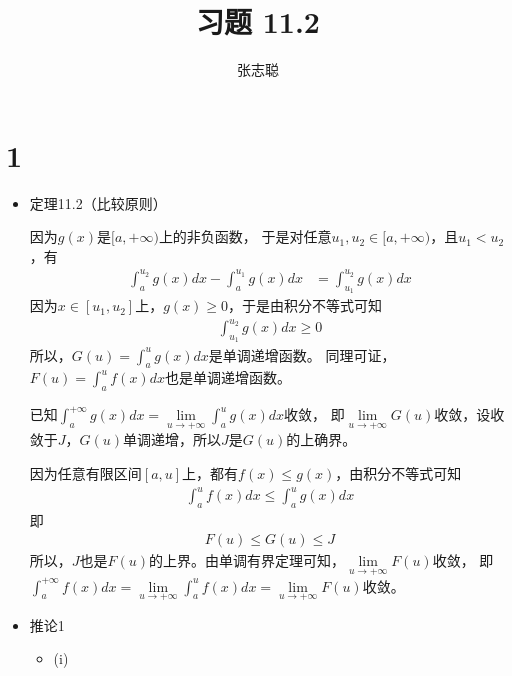 \documentclass{article}
\begin{document}
\title{习题 11.2}
\author{张志聪}
\maketitle

\section*{1}

\begin{itemize}
  \item 定理11.2（比较原则）

        因为$g(x)$是$[a, + \infty)$上的非负函数，
        于是对任意$u_1, u_2 \in [a, + \infty)$，且$u_1 < u_2$，有
        \begin{align*}
          \int_{a}^{u_2} g(x) dx - \int_{a}^{u_1} g(x) dx
           & = \int_{u_1}^{u_2} g(x) dx
        \end{align*}
        因为$x \in [u_1, u_2]$上，$g(x) \geq 0$，于是由积分不等式可知
        \begin{align*}
          \int_{u_1}^{u_2} g(x) dx \geq 0
        \end{align*}
        所以，$G(u) = \int_{a}^{u} g(x) dx$是单调递增函数。
        同理可证，$F(u) = \int_{a}^{u} f(x) dx$也是单调递增函数。

        已知$\int_{a}^{+\infty} g(x) dx = \lim \limits_{u \to +\infty} \int_{a}^{u} g(x) dx$收敛，
        即$\lim \limits_{u \to +\infty} G(u)$收敛，设收敛于$J$，$G(u)$单调递增，所以$J$是$G(u)$的上确界。

        因为任意有限区间$[a, u]$上，都有$f(x) \leq g(x)$，由积分不等式可知
        \begin{align*}
          \int_{a}^{u} f(x) dx \leq \int_{a}^{u} g(x) dx
        \end{align*}
        即
        \begin{align*}
          F(u) \leq G(u) \leq J
        \end{align*}
        所以，$J$也是$F(u)$的上界。由单调有界定理可知，$\lim \limits_{u \to +\infty} F(u)$收敛，
        即$\int_{a}^{+\infty} f(x) dx = \lim\limits_{u \to +\infty} \int_{a}^{u} f(x) dx = \lim \limits_{u \to +\infty} F(u)$收敛。

  \item 推论1

        \begin{itemize}
          \item (i)


\end{itemize}
\end{itemize}
\end{document}
